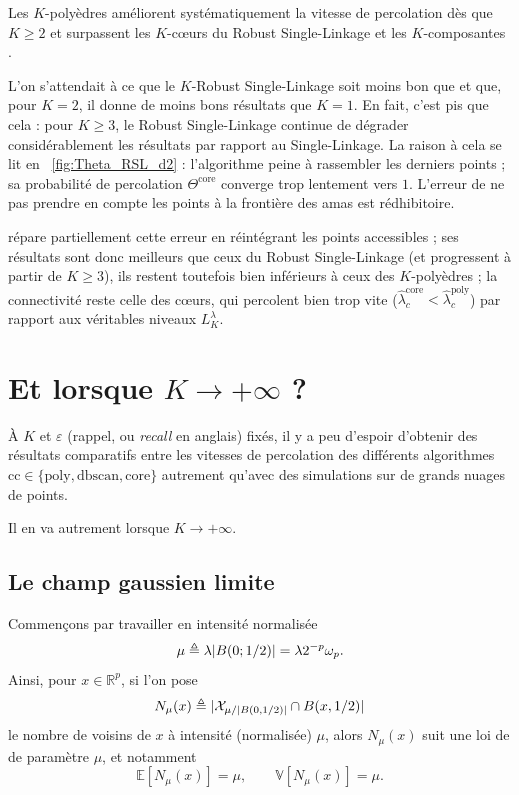 Les $K$-polyèdres améliorent systématiquement la vitesse de percolation dès que $K\ge2$ et surpassent les $K$-cœurs du Robust Single-Linkage et les $K$-composantes \DBSCAN. 

L'on s'attendait à ce que le $K$-Robust Single-Linkage soit moins bon que \DBSCAN et que, pour $K=2$, il donne de moins bons résultats que $K=1$. 
En fait, c'est pis que cela : pour $K\ge3$, le Robust Single-Linkage continue de dégrader considérablement les résultats par rapport au Single-Linkage. La raison à cela se lit en \Fig~\ref{fig:Theta_RSL_d2} : l'algorithme peine à rassembler les derniers points ; sa probabilité de percolation $\Theta^{\mathrm{core}}$ converge trop lentement vers $1$. L'erreur de ne pas prendre en compte les points à la frontière des amas est rédhibitoire.

\DBSCAN répare partiellement cette erreur en réintégrant les points accessibles ; ses résultats sont donc meilleurs que ceux du Robust Single-Linkage (et progressent à partir de $K \ge3$), ils restent toutefois bien inférieurs à ceux des $K$-polyèdres ; la connectivité reste celle des cœurs, qui percolent bien trop vite ($\hat \lambda_c^{\mathrm{core}} < \hat \lambda_c^{\mathrm{poly}}$) par rapport aux véritables niveaux $L_K^\lambda$.



\section{Et lorsque $K\to+\infty$ ?}
\label{sec:comparaison_asymptotique}

À $K$ et $\varepsilon$ (rappel, ou \emph{recall} en anglais) fixés, il y a peu d'espoir d'obtenir des résultats comparatifs entre les vitesses de percolation des différents algorithmes $\mathrm{cc} \in \bigl\{ \mathrm{poly}, \mathrm{dbscan}, \mathrm{core} \bigr\}$ autrement qu'avec des simulations sur de grands nuages de points.

Il en va autrement lorsque $K \to +\infty$.


\subsection{Le champ gaussien limite}

Commençons par travailler en intensité normalisée
\[
    \mu \triangleq \lambda \lvert B(0;1/2) \rvert  = \lambda 2^{-p}\omega_p .
\]
Ainsi, pour $x\in\mathbb R^p$, si l'on pose
\[
    N_\mu(x)
    \triangleq
    \lvert \mathcal X_{\mu/\lvert B(0,1/2) \rvert}\cap B(x,1/2) \rvert
\]
le nombre de voisins de $x$ à intensité (normalisée) $\mu$, alors $N_\mu(x)$ suit une loi de  de paramètre $\mu$, et notamment
\[
    \mathbb E[N_\mu(x)]=\mu,
    \qquad
    \mathbb V[N_\mu(x)]=\mu.
\]


